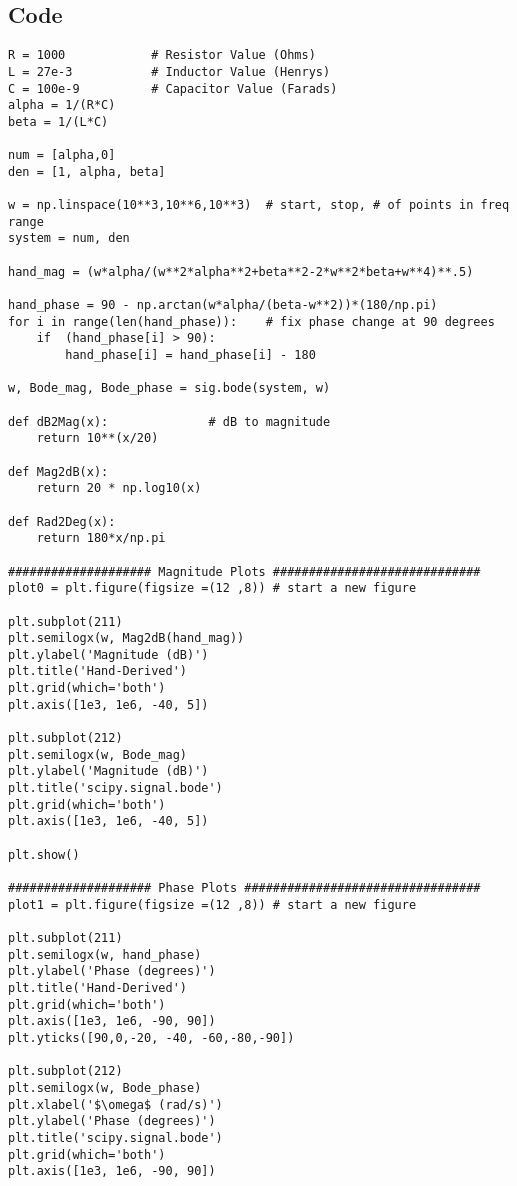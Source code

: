 \subsection{Code}

\begin{scriptsize}
\begin{lstlisting}
R = 1000            # Resistor Value (Ohms)
L = 27e-3           # Inductor Value (Henrys)
C = 100e-9          # Capacitor Value (Farads)
alpha = 1/(R*C) 
beta = 1/(L*C)

num = [alpha,0]             
den = [1, alpha, beta]

w = np.linspace(10**3,10**6,10**3)  # start, stop, # of points in freq range
system = num, den

hand_mag = (w*alpha/(w**2*alpha**2+beta**2-2*w**2*beta+w**4)**.5)

hand_phase = 90 - np.arctan(w*alpha/(beta-w**2))*(180/np.pi) 
for i in range(len(hand_phase)):    # fix phase change at 90 degrees
    if  (hand_phase[i] > 90):
        hand_phase[i] = hand_phase[i] - 180

w, Bode_mag, Bode_phase = sig.bode(system, w)

def dB2Mag(x):              # dB to magnitude
    return 10**(x/20)

def Mag2dB(x):
    return 20 * np.log10(x)

def Rad2Deg(x):
    return 180*x/np.pi

#################### Magnitude Plots #############################
plot0 = plt.figure(figsize =(12 ,8)) # start a new figure        

plt.subplot(211)
plt.semilogx(w, Mag2dB(hand_mag))
plt.ylabel('Magnitude (dB)')
plt.title('Hand-Derived')
plt.grid(which='both')
plt.axis([1e3, 1e6, -40, 5])

plt.subplot(212)
plt.semilogx(w, Bode_mag)    
plt.ylabel('Magnitude (dB)')
plt.title('scipy.signal.bode')
plt.grid(which='both')
plt.axis([1e3, 1e6, -40, 5])

plt.show()

#################### Phase Plots #################################
plot1 = plt.figure(figsize =(12 ,8)) # start a new figure

plt.subplot(211)
plt.semilogx(w, hand_phase)
plt.ylabel('Phase (degrees)')
plt.title('Hand-Derived')
plt.grid(which='both')
plt.axis([1e3, 1e6, -90, 90])
plt.yticks([90,0,-20, -40, -60,-80,-90])

plt.subplot(212)
plt.semilogx(w, Bode_phase)   
plt.xlabel('$\omega$ (rad/s)') 
plt.ylabel('Phase (degrees)')
plt.title('scipy.signal.bode')
plt.grid(which='both')
plt.axis([1e3, 1e6, -90, 90])


\end{lstlisting}
\end{scriptsize}
